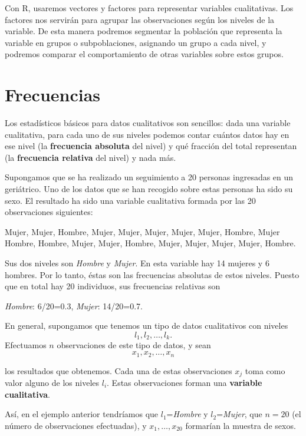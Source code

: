 \documentclass[]{book}
\theoremstyle{definition}
\theoremstyle{definition}
\theoremstyle{definition}
\theoremstyle{remark}
\let\BeginKnitrBlock\begin \let\EndKnitrBlock\end
\begin{document}
Con R, usaremos vectores y factores para representar variables cualitativas. Los factores nos servirán para agrupar las observaciones según los niveles de la variable. De esta manera podremos segmentar la población que representa la variable en grupos o subpoblaciones, asignando un grupo a cada nivel, y podremos comparar el comportamiento de otras variables sobre estos grupos.

\hypertarget{sec:edqual}{%
\section{Frecuencias}\label{sec:edqual}}

Los estadísticos básicos para datos cualitativos son sencillos: dada una variable
cualitativa, para cada uno de sus niveles podemos contar cuántos datos hay en ese nivel (la \textbf{frecuencia absoluta} del nivel) y qué fracción del total representan (la \textbf{frecuencia relativa} del nivel) y nada más.

\BeginKnitrBlock{example}
\protect\hypertarget{exm:ex1601}{}{\label{exm:ex1601} }Supongamos que se ha realizado un seguimiento a 20 personas ingresadas en un geriátrico. Uno de los datos que se han recogido sobre estas personas ha sido su sexo. El resultado ha sido una variable cualitativa formada por las 20 observaciones siguientes:
\EndKnitrBlock{example}

Mujer, Mujer, Hombre, Mujer, Mujer, Mujer, Mujer, Mujer, Hombre, Mujer
Hombre, Hombre, Mujer, Mujer, Hombre, Mujer, Mujer, Mujer, Mujer, Hombre.

Sus dos niveles son \emph{Hombre} y \emph{Mujer}. En esta variable
hay 14 mujeres y 6 hombres. Por lo tanto, éstas son las frecuencias absolutas de estos niveles. Puesto que en total hay 20 individuos, sus frecuencias relativas son

\emph{Hombre}: 6/20=0.3, \emph{Mujer}: 14/20=0.7.

En general, supongamos que tenemos un tipo de datos cualitativos con niveles
\[
l_1, l_2, \ldots, l_k.
\]
Efectuamos \(n\) observaciones de este tipo de datos, y sean
\[
x_1, x_2, \ldots, x_n
\]

los resultados que obtenemos.
Cada una de estas observaciones \(x_j\) toma como valor alguno de los niveles \(l_i\). Estas observaciones forman una \textbf{variable cualitativa}.

Así, en el ejemplo anterior tendríamos que \(l_1\)=\emph{Hombre} y \(l_2\)=\emph{Mujer},
que \(n=20\) (el número de observaciones efectuadas), y \(x_1, \ldots, x_{20}\) formarían la muestra de sexos.
\end{document}
